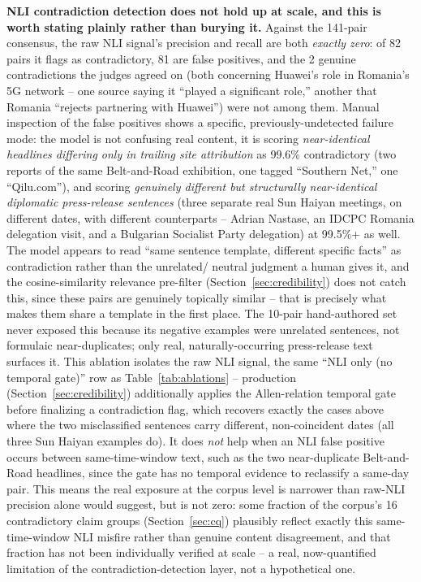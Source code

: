 \documentclass[conference]{IEEEtran}
\begin{document}
\textbf{NLI contradiction detection does not hold up at scale, and this is
worth stating plainly rather than burying it.} Against the 141-pair
consensus, the raw NLI signal's precision and recall are both
\emph{exactly zero}: of 82 pairs it flags as contradictory, 81 are
false positives, and the 2 genuine contradictions the judges agreed on
(both concerning Huawei's role in Romania's 5G network -- one source
saying it ``played a significant role,'' another that Romania ``rejects
partnering with Huawei'') were not among them. Manual inspection of the
false positives shows a specific, previously-undetected failure mode: the
model is not confusing real content, it is scoring \emph{near-identical
headlines differing only in trailing site attribution} as 99.6\%
contradictory (two reports of the same Belt-and-Road exhibition, one
tagged ``Southern Net,'' one ``Qilu.com''), and scoring
\emph{genuinely different but structurally near-identical diplomatic
press-release sentences} (three separate real Sun Haiyan meetings, on
different dates, with different counterparts -- Adrian Nastase, an IDCPC
Romania delegation visit, and a Bulgarian Socialist Party delegation) at
99.5\%+ as well. The model appears to read ``same sentence template,
different specific facts'' as contradiction rather than the unrelated/
neutral judgment a human gives it, and the cosine-similarity relevance
pre-filter (Section~\ref{sec:credibility}) does not catch this, since these
pairs are genuinely topically similar -- that is precisely what makes them
share a template in the first place. The 10-pair hand-authored set never exposed this because its negative
examples were unrelated sentences, not formulaic near-duplicates; only
real, naturally-occurring press-release text surfaces it. This ablation
isolates the raw NLI signal, the same ``NLI only (no temporal gate)'' row
as Table~\ref{tab:ablations} -- production (Section~\ref{sec:credibility})
additionally applies the Allen-relation temporal gate before finalizing a
contradiction flag, which recovers exactly the cases above where the two
misclassified sentences carry different, non-coincident dates (all three
Sun Haiyan examples do). It does \emph{not} help when an NLI false positive
occurs between same-time-window text, such as the two near-duplicate
Belt-and-Road headlines, since the gate has no temporal evidence to
reclassify a same-day pair. This means the real exposure at the corpus
level is narrower than raw-NLI precision alone would suggest, but is not
zero: some fraction of the corpus's 16 contradictory claim groups
(Section~\ref{sec:cq}) plausibly reflect exactly this same-time-window NLI
misfire rather than genuine content disagreement, and that fraction has not
been individually verified at scale -- a real, now-quantified limitation of
the contradiction-detection layer, not a hypothetical one.
\end{document}
